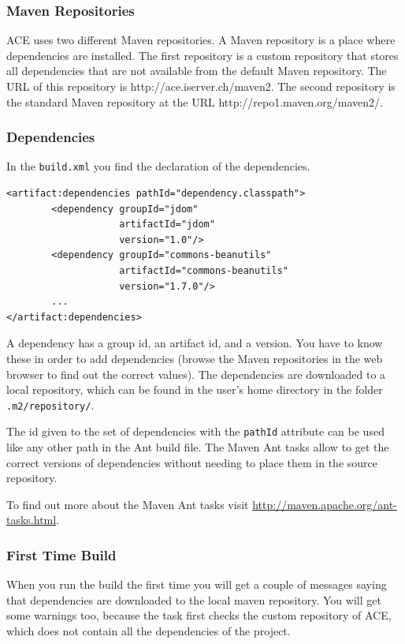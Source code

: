 \documentclass[11pt,a4paper]{article}
\begin{document}
\subsubsection{Maven Repositories}
ACE uses two different Maven repositories. A Maven repository is a place where
dependencies are installed. The first repository is a custom repository that
stores all dependencies that are not available from the default Maven
repository. The URL of this repository is http://ace.iserver.ch/maven2. The
second repository is the standard Maven repository at the URL
http://repo1.maven.org/maven2/.

\subsubsection{Dependencies}
In the \texttt{build.xml} you find the declaration of the dependencies.

\small{
\begin{verbatim}
<artifact:dependencies pathId="dependency.classpath">
		<dependency groupId="jdom" 
		            artifactId="jdom" 
		            version="1.0"/>
		<dependency groupId="commons-beanutils" 
		            artifactId="commons-beanutils" 
		            version="1.7.0"/>
        ...
</artifact:dependencies>
\end{verbatim}
}

A dependency has a group id, an artifact id, and a version. You have to know
these in order to add dependencies (browse the Maven repositories in the
web browser to find out the correct values). 
The dependencies are downloaded to a local repository,
which can be found in the user's home directory in the folder 
\texttt{.m2/repository/}.

The id given to the set of dependencies with the \texttt{pathId} attribute
can be used like any other path in the Ant build file. The Maven Ant tasks
allow to get the correct versions of dependencies without needing to place
them in the source repository.

To find out more about the Maven Ant tasks visit
\href{http://maven.apache.org/ant-tasks.html}{http://maven.apache.org/ant-tasks.html}.

\subsubsection{First Time Build}
When you run the build the first time you will get a couple of messages saying that dependencies are downloaded to the local maven repository. You will get 
some warnings too, because the task first checks the custom
repository of ACE, which does not contain all the dependencies of the project.
\end{document}
